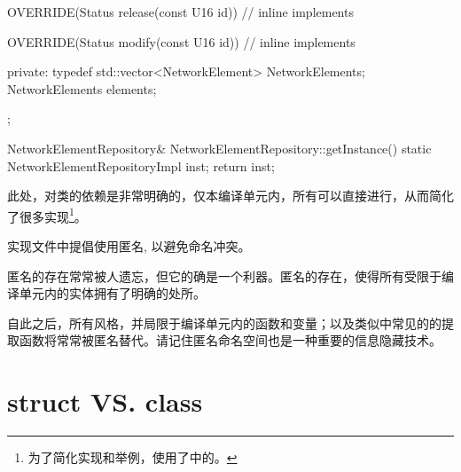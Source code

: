\begin{content}
\begin{leftbar}
\begin{c++}[caption={\ttfamily{ne/NetworkElementRepository.cpp}}]
{{        OVERRIDE(Status release(const U16 id))
        {
            // inline implements
        }

        OVERRIDE(Status modify(const U16 id))
        {
            // inline implements
        }
    
    private:
        typedef std::vector<NetworkElement> NetworkElements;
        NetworkElements elements;
    };
}

NetworkElementRepository& NetworkElementRepository::getInstance()
{
    static NetworkElementRepositoryImpl inst;
    return inst;
}
\end{c++}
\end{leftbar}

此处，对类的依赖是非常明确的，仅本编译单元内，所有可以直接进行，从而简化了很多实现\footnote{为了简化实现和举例，使用了中的。}。

\begin{regulation}
实现文件中提倡使用匿名, 以避免命名冲突。
\end{regulation}

匿名的存在常常被人遗忘，但它的确是一个利器。匿名的存在，使得所有受限于编译单元内的实体拥有了明确的处所。

自此之后，所有\clang{}风格，并局限于编译单元内的函数和变量；以及类似中常见的的提取函数将常常被匿名替代。请记住匿名命名空间也是一种重要的信息隐藏技术。

\end{content}

\section{struct VS. class}

